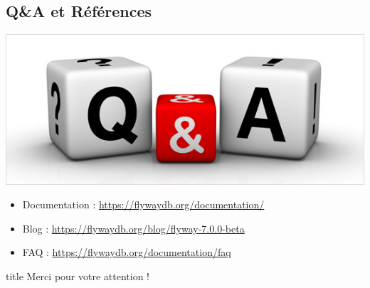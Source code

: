 \documentclass[slidestop,compress,11pt,xcolor=dvipsnames,french]{beamer}
\begin{document}
\subsection*{Q\&A et Références}
\begin{frame}
\begin{center}
 \includegraphics[scale=0.3,keepaspectratio=true]{qa.jpg}
\end{center}

\vspace{1cm}
\begin{itemize}
 \item Documentation : \url{https://flywaydb.org/documentation/} 
 \item Blog : \url{https://flywaydb.org/blog/flyway-7.0.0-beta}
 \item FAQ : \url{https://flywaydb.org/documentation/faq}
\end{itemize}

\end{frame}

\begin{frame}
\vspace{2.5cm}
\begin{center} 
\begin{beamercolorbox}[rounded=true,sep=8pt,center]{title}
   	\Huge Merci pour votre attention ! 
		\end{beamercolorbox}%
\end{center} 
\end{frame} 
\end{document}
